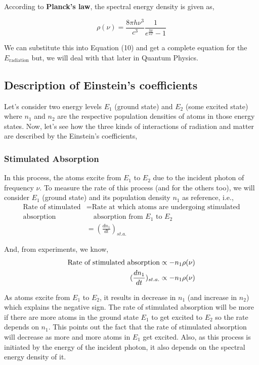 \documentclass[12pt]{article}
\begin{document}
According to \textbf{Planck's law}, the spectral energy density is given as,

\begin{equation}
    \rho(\nu) = \frac{8\pi h\nu^3}{c^3} \frac{1}{e^\frac{h\nu}{kT} - 1}
\end{equation}

We can substitute this into Equation (10) and get a complete equation for the $E_{\text{radiation}}$ but, we will deal with that later in Quantum Physics.

\subsection{Description of Einstein's coefficients}

Let's consider two energy levels $E_{1}$ (ground state) and $E_{2}$ (some excited state) where $n_{1}$ and $n_{2}$ are the respective population densities of atoms in those energy states. Now, let's see how the three kinds of interactions of radiation and matter are described by the Einstein's coefficients,

\subsubsection{Stimulated Absorption}

In this process, the atoms excite from $E_{1}$ to $E_{2}$ due to the incident photon of frequency $\nu$. To measure the rate of this process (and for the others too), we will consider $E_{1}$ (ground state) and its population density $n_{1}$ as reference, i.e.,
\begin{align*}
    \text{Rate of stimulated} & = \text{Rate at which atoms are undergoing stimulated} \\
    \text{absorption} & \quad \text{absorption from } E_{1} \text{ to } E_{2} \\ 
    & = (\frac{dn_{1}}{dt})_{st.a.}
\end{align*}

And, from experiments, we know, 
\begin{align*}
    \textnormal{Rate of stimulated absorption} \propto -n_{1}\rho(\nu) \\ 
    (\frac{dn_{1}}{dt})_{st.a.} \propto -n_{1}\rho(\nu)
\end{align*}

As atoms excite from $E_{1}$ to $E_{2}$, it results in decrease in $n_{1}$ (and increase in $n_{2}$) which explains the negative sign. The rate of stimulated absorption will be more if there are more atoms in the ground state $E_{1}$ to get excited to $E_{2}$ so the rate depends on $n_{1}$. This points out the fact that the rate of stimulated absorption will decrease as more and more atoms in $E_{1}$ get excited. Also, as this process is initiated by the energy of the incident photon, it also depends on the spectral energy density of it. \vspace{.2cm}
\end{document}
